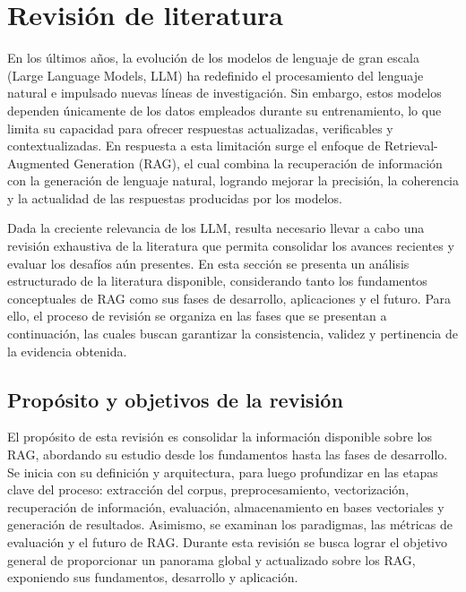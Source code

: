 \section{Revisión de literatura}
En los últimos años, la evolución de los modelos de lenguaje de gran escala (Large Language Models, LLM) ha redefinido el procesamiento del lenguaje natural
e impulsado nuevas líneas de investigación. 
Sin embargo, estos modelos dependen únicamente de los datos empleados durante su entrenamiento, lo que limita su capacidad para ofrecer respuestas actualizadas, verificables y 
contextualizadas. En respuesta a esta limitación surge el enfoque de Retrieval-Augmented Generation (RAG), el cual combina la recuperación de información con la generación de 
lenguaje natural, logrando mejorar la precisión, la coherencia y la actualidad de las respuestas producidas por los modelos.

Dada la creciente relevancia de los LLM, resulta necesario llevar a cabo una revisión exhaustiva de la literatura que permita consolidar los avances recientes y evaluar los desafíos aún presentes.
En esta sección se presenta un análisis estructurado de la literatura disponible, considerando tanto los fundamentos conceptuales de RAG como sus fases de desarrollo, 
aplicaciones y el futuro. Para ello, el proceso de revisión se organiza en las fases que se presentan a continuación, las cuales buscan garantizar la consistencia, validez 
y pertinencia de la evidencia obtenida.

\subsection{Propósito y objetivos de la revisión}
El propósito de esta revisión es consolidar la información disponible sobre los RAG, abordando su estudio desde los fundamentos hasta las fases de desarrollo. 
Se inicia con su definición y arquitectura, para luego profundizar en las etapas clave del proceso: extracción del corpus, preprocesamiento, vectorización, recuperación de información, 
evaluación, almacenamiento en bases vectoriales y generación de resultados. Asimismo, se examinan los paradigmas, las métricas de evaluación y el futuro de RAG.
Durante esta revisión se busca lograr el objetivo general de proporcionar un panorama global y actualizado sobre los RAG,
exponiendo sus fundamentos, desarrollo y aplicación.

